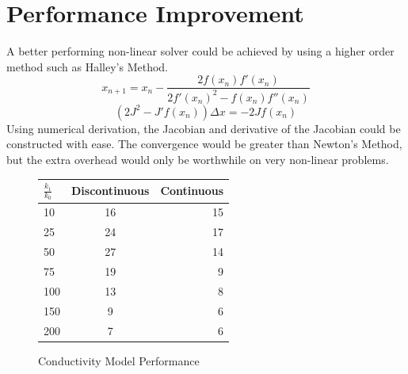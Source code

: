 \documentclass[12pt,twocolumn]{article}
\begin{document}
\section*{Performance Improvement}
A better performing non-linear solver could be achieved by using a higher order method such as Halley's Method.
\[x_{n+1} = x_n - \frac{2 f(x_n)f'(x_n)}{2f'(x_n)^2-f(x_n)f''(x_n)}\]
\[(2J^2-J'f(x_n))\Delta x = - 2Jf(x_n)\]
Using numerical derivation, the Jacobian and derivative of the Jacobian could be constructed with ease.
The convergence would be greater than Newton's Method, but the extra overhead would only be worthwhile on
very non-linear problems.
\begin{figure}
\begin{center}
\begin{tabular}{|l|c|r|}
\hline
$\frac{k_1}{k_0}$ & Discontinuous & Continuous\\ \hline
10 & 16 & 15\\ \hline
25 & 24 & 17\\ \hline
50 & 27 & 14\\ \hline
75 & 19 & 9\\ \hline
100 & 13 & 8\\ \hline
150 & 9 & 6\\ \hline
200 & 7 & 6\\ \hline
\end{tabular}
\end{center}
\footnotesize{\caption{Conductivity Model Performance}}
\end{figure}
\end{document}
